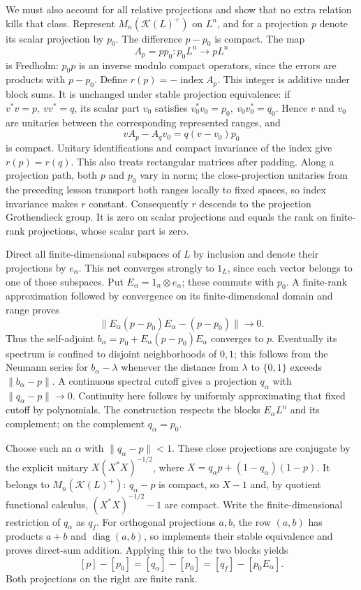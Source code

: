\documentclass[
  11pt,
]{article}
\begin{document}
We must also account for all relative projections and show that no extra
relation kills that class. Represent \(M_n(\mathcal K(L)^+)\) on
\(L^n\), and for a projection \(p\) denote its scalar projection by
\(p_0\). The difference \(p-p_0\) is compact. The map \[
A_p=pp_0:p_0L^n\longrightarrow pL^n
\] is Fredholm: \(p_0p\) is an inverse modulo compact operators, since
the errors are products with \(p-p_0\). Define
\(r(p)=-\operatorname{index}A_p\). This integer is additive under block
sums. It is unchanged under stable projection equivalence: if
\(v^*v=p,\ vv^*=q\), its scalar part \(v_0\) satisfies
\(v_0^*v_0=p_0,\ v_0v_0^*=q_0\). Hence \(v\) and \(v_0\) are unitaries
between the corresponding represented ranges, and \[
vA_p-A_qv_0=q(v-v_0)p_0
\] is compact. Unitary identifications and compact invariance of the
index give \(r(p)=r(q)\). This also treats rectangular matrices after
padding. Along a projection path, both \(p\) and \(p_0\) vary in norm;
the close-projection unitaries from the preceding lesson transport both
ranges locally to fixed spaces, so index invariance makes \(r\)
constant. Consequently \(r\) descends to the projection Grothendieck
group. It is zero on scalar projections and equals the rank on
finite-rank projections, whose scalar part is zero.

Direct all finite-dimensional subspaces of \(L\) by inclusion and denote
their projections by \(e_\alpha\). This net converges strongly to
\(1_L\), since each vector belongs to one of those subspaces. Put
\(E_\alpha=1_n\otimes e_\alpha\); these commute with \(p_0\). A
finite-rank approximation followed by convergence on its
finite-dimensional domain and range proves \[
\|E_\alpha(p-p_0)E_\alpha-(p-p_0)\|\longrightarrow0.
\] Thus the self-adjoint \(b_\alpha=p_0+E_\alpha(p-p_0)E_\alpha\)
converges to \(p\). Eventually its spectrum is confined to disjoint
neighborhoods of \(0,1\); this follows from the Neumann series for
\(b_\alpha-\lambda\) whenever the distance from \(\lambda\) to
\(\{0,1\}\) exceeds \(\|b_\alpha-p\|\). A continuous spectral cutoff
gives a projection \(q_\alpha\) with \(\|q_\alpha-p\|\to0\). Continuity
here follows by uniformly approximating that fixed cutoff by
polynomials. The construction respects the blocks \(E_\alpha L^n\) and
its complement; on the complement \(q_\alpha=p_0\).

Choose such an \(\alpha\) with \(\|q_\alpha-p\|<1\). These close
projections are conjugate by the explicit unitary \(X(X^*X)^{-1/2}\),
where \(X=q_\alpha p+(1-q_\alpha)(1-p)\). It belongs to
\(M_n(\mathcal K(L)^+)\): \(q_\alpha-p\) is compact, so \(X-1\) and, by
quotient functional calculus, \((X^*X)^{-1/2}-1\) are compact. Write the
finite-dimensional restriction of \(q_\alpha\) as \(q_f\). For
orthogonal projections \(a,b\), the row \((a,b)\) has products \(a+b\)
and \(\operatorname{diag}(a,b)\), so implements their stable equivalence
and proves direct-sum addition. Applying this to the two blocks yields
\[
[p]-[p_0]=[q_\alpha]-[p_0]=[q_f]-[p_0E_\alpha].
\] Both projections on the right are finite rank.
\end{document}
